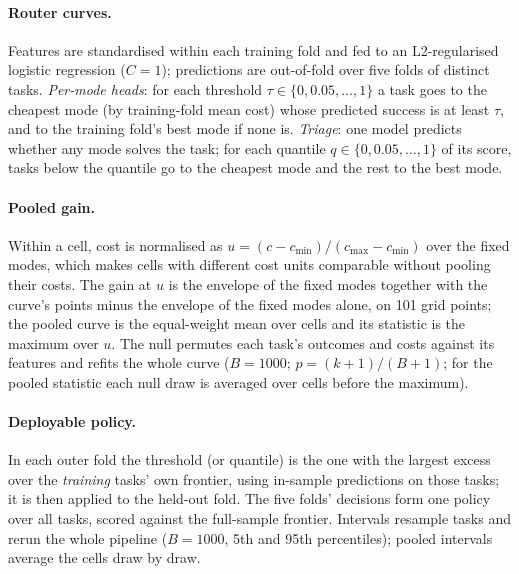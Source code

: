 \paragraph{Router curves.} Features are standardised within each training fold and fed to an L2-regularised logistic regression ($C=1$); predictions are out-of-fold over five folds of distinct tasks. \emph{Per-mode heads}: for each threshold $\tau \in \{0, 0.05, \dots, 1\}$ a task goes to the cheapest mode (by training-fold mean cost) whose predicted success is at least $\tau$, and to the training fold's best mode if none is. \emph{Triage}: one model predicts whether any mode solves the task; for each quantile $q \in \{0, 0.05, \dots, 1\}$ of its score, tasks below the quantile go to the cheapest mode and the rest to the best mode.

\paragraph{Pooled gain.} Within a cell, cost is normalised as $u = (c - c_{\min})/(c_{\max} - c_{\min})$ over the fixed modes, which makes cells with different cost units comparable without pooling their costs. The gain at $u$ is the envelope of the fixed modes together with the curve's points minus the envelope of the fixed modes alone, on 101 grid points; the pooled curve is the equal-weight mean over cells and its statistic is the maximum over $u$. The null permutes each task's outcomes and costs against its features and refits the whole curve ($B=1000$; $p=(k+1)/(B+1)$; for the pooled statistic each null draw is averaged over cells before the maximum).

\paragraph{Deployable policy.} In each outer fold the threshold (or quantile) is the one with the largest excess over the \emph{training} tasks' own frontier, using in-sample predictions on those tasks; it is then applied to the held-out fold. The five folds' decisions form one policy over all tasks, scored against the full-sample frontier. Intervals resample tasks and rerun the whole pipeline ($B=1000$, 5th and 95th percentiles); pooled intervals average the cells draw by draw.

